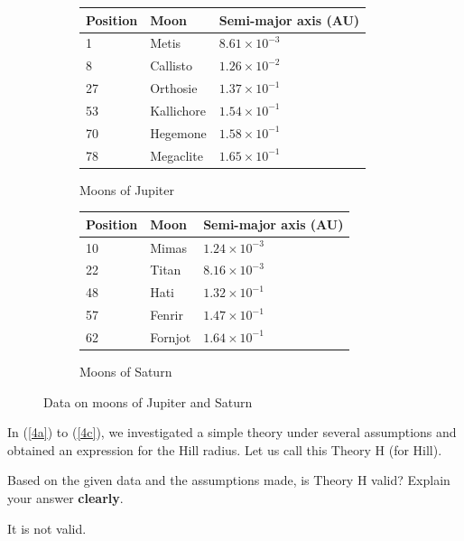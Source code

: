 \documentclass[a4paper,11pt]{exam}
\begin{document}
\begin{questions}
{	\begin{figure}[H]
		\centering
		\begin{subfigure}{0.45\textwidth}
			\centering
			\begin{tabularx}{0.9\textwidth}{@{}lXY@{}}
				\toprule \textbf{Position} & \textbf{Moon} & \textbf{Semi-major axis (AU)}\\  & Metis & $8.61\times 10^{-3}$\\
				8 & Callisto & $1.26\times 10^{-2}$\\
				27 & Orthosie & $1.37\times 10^{-1}$\\
				53 & Kallichore & $1.54\times 10^{-1}$\\
				70 & Hegemone & $1.58\times 10^{-1}$\\
				78 & Megaclite & $1.65\times 10^{-1}$\\
				\bottomrule
			\end{tabularx}
			\renewcommand{\figurename}{Table}
			\caption{Moons of Jupiter}
			\label{tbl10a}
		\end{subfigure}
		\begin{subfigure}{0.45\textwidth}
			\vspace*{-21pt}
			\centering
			\begin{tabularx}{0.9\textwidth}{@{}lXY@{}}
				\toprule \textbf{Position} & \textbf{Moon} & \textbf{Semi-major axis (AU)}\\  & Mimas & $1.24\times 10^{-3}$\\
				22 & Titan & $8.16\times 10^{-3}$\\
				48 & Hati & $1.32\times 10^{-1}$\\
				57 & Fenrir & $1.47\times 10^{-1}$\\
				62 & Fornjot & $1.64\times 10^{-1}$\\
				\bottomrule
			\end{tabularx}
			\renewcommand{\figurename}{Table}
			\caption{Moons of Saturn}
			\label{tbl10b}
		\end{subfigure}
		\caption{Data on moons of Jupiter and Saturn}
	\end{figure}
}

\vspace*{-10pt}
\question[3] 
	In (\ref{4a}) to (\ref{4c}), we investigated a simple theory under several assumptions and obtained an expression for the Hill radius. Let us call this Theory H (for Hill). 
	
	Based on the given data and the assumptions made, is Theory H valid? Explain your answer \textbf{clearly}.
	\droppoints
	\begin{solution}
		It is not valid.
		

\end{solution}
\end{questions}
\end{document}
